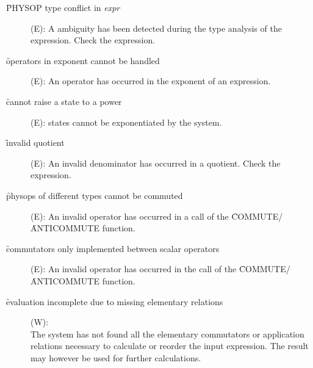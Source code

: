 \begin{description}
\item[\f{PHYSOP type conflict in} \textit{expr}] (E): A ambiguity has been
detected during the type analysis of the expression. Check the
expression.

\item[\f{operators in exponent cannot be handled}] (E): An operator has
occurred in the exponent of an expression.

\item[\f{cannot raise a state to a power}] (E): states cannot be
exponentiated by the system.

\item[\f{invalid quotient}] (E): An invalid denominator has occurred in a
quotient. Check the expression.

\item[\f{physops of different types cannot be commuted}] (E): An invalid
operator has occurred in a call of the \f{COMMUTE}/\f{ANTICOMMUTE} function.

\item[\f{commutators only implemented between scalar operators}] (E):
An invalid operator has occurred in the call of the
\f{COMMUTE}/\f{ANTICOMMUTE} function.

\item[\f{evaluation incomplete due to missing elementary relations}] (W):
\\
The system has not found all
the elementary commutators or application relations necessary to
calculate or reorder the input expression. The result may however be
used for further calculations.
\end{description}
